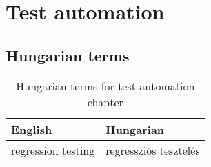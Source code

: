 \chapter{Test automation}



\section{Hungarian terms}

\begin{table}[ht]
    \centering
    \small
    \caption{Hungarian terms for test automation chapter}
    \begin{tabular}{ll}
        \toprule
        \textbf{English} & \textbf{Hungarian} \\
        \midrule
        regression testing & regressziós tesztelés \\
        \bottomrule
        \end{tabular}
        \label{tab:overview:hungarian-terms-test-automation}
\end{table} 